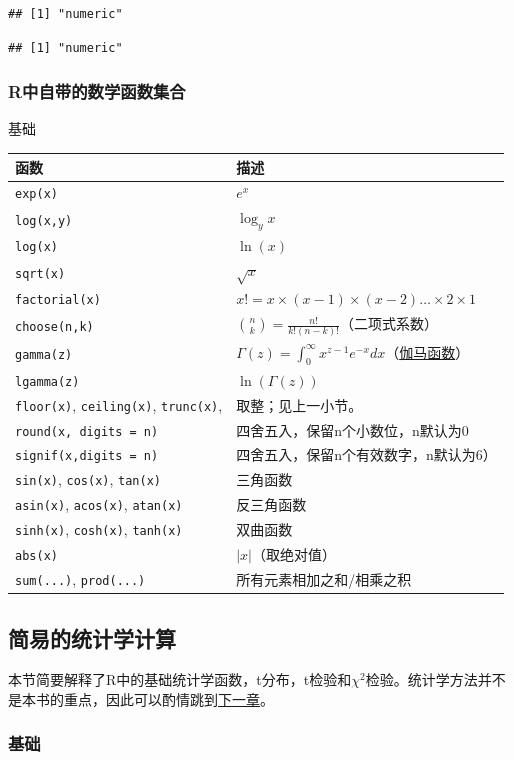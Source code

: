 \documentclass[]{book}
\begin{document}
\begin{verbatim}
## [1] "numeric"
\end{verbatim}

\begin{verbatim}
## [1] "numeric"
\end{verbatim}

\hypertarget{math-builtin-mathFuncs}{%
\subsubsection{R中自带的数学函数集合}\label{math-builtin-mathFuncs}}

基础

\begin{longtable}[]{@{}ll@{}}
\toprule
函数 & 描述\tabularnewline
\midrule
\endhead
\texttt{exp(x)} & \(e^x\)\tabularnewline
\texttt{log(x,y)} & \(\log_yx\)\tabularnewline
\texttt{log(x)} & \(\ln(x)\)\tabularnewline
\texttt{sqrt(x)} & \(\sqrt{x}\)\tabularnewline
\texttt{factorial(x)} & \(x!=x\times(x-1)\times(x-2)\ldots\times2\times1\)\tabularnewline
\texttt{choose(n,k)} & \(\binom{n}{k}=\frac{n!}{k!(n-k)!}\)（二项式系数）\tabularnewline
\texttt{gamma(z)} & \(\Gamma(z)=\int_0^\infty x^{z-1}e^{-x}dx\)（\href{https://en.wikipedia.org/wiki/Gamma_function}{伽马函数}）\tabularnewline
\texttt{lgamma(z)} & \(\ln(\Gamma(z))\)\tabularnewline
\texttt{floor(x)}, \texttt{ceiling(x)}, \texttt{trunc(x)}, & 取整；见上一小节。\tabularnewline
\texttt{round(x,\ digits\ =\ n)} & 四舍五入，保留n个小数位，n默认为0\tabularnewline
\texttt{signif(x,digits\ =\ n)} & 四舍五入，保留n个有效数字，n默认为6）\tabularnewline
\texttt{sin(x)}, \texttt{cos(x)}, \texttt{tan(x)} & 三角函数\tabularnewline
\texttt{asin(x)}, \texttt{acos(x)}, \texttt{atan(x)} & 反三角函数\tabularnewline
\texttt{sinh(x)}, \texttt{cosh(x)}, \texttt{tanh(x)} & 双曲函数\tabularnewline
\texttt{abs(x)} & \(|x|\)（取绝对值）\tabularnewline
\texttt{sum(...)}, \texttt{prod(...)} & 所有元素相加之和/相乘之积\tabularnewline
\bottomrule
\end{longtable}

\hypertarget{statistics}{%
\subsection{简易的统计学计算}\label{statistics}}

本节简要解释了R中的基础统计学函数，t分布，t检验和\(\chi^2\)检验。统计学方法并不是本书的重点，因此可以酌情跳到\protect\hyperlink{tibble}{下一章}。

\hypertarget{stats-basics}{%
\subsubsection{基础}\label{stats-basics}}
\end{document}
